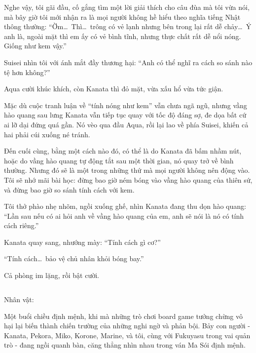 \documentclass[../main.tex]{subfiles}
\begin{document}
Nghe vậy, tôi gãi đầu, cố gắng tìm một lời giải thích cho câu đùa mà tôi vừa nói, mà bây giờ tôi mới nhận ra là mọi người không hề hiểu theo nghĩa tiếng Nhật thông thường: ``Ờm\dots\ Thì\dots\ trông có vẻ lạnh nhưng bên trong lại rất dễ chảy\dots\ Ý anh là, ngoài mặt thì em ấy có vẻ bình tĩnh, nhưng thực chất rất dễ nổi nóng. Giống như kem vậy.''

Suisei nhìn tôi với ánh mắt đầy thương hại: ``Anh có thể nghĩ ra cách so sánh nào tệ hơn không?''

Aqua cười khúc khích, còn Kanata thì đỏ mặt, vừa xấu hổ vừa tức giận.

Mặc dù cuộc tranh luận về ``tính nóng như kem'' vẫn chưa ngã ngũ, nhưng vầng hào quang sau lưng Kanata vẫn tiếp tục quay với tốc độ đáng sợ, đe dọa bất cứ ai lỡ dại đứng quá gần. Nó vèo qua đầu Aqua, rồi lại lao về phía Suisei, khiến cả hai phải cúi xuống né tránh.

Đến cuối cùng, bằng một cách nào đó, có thể là do Kanata đã bấm nhầm nút, hoặc do vầng hào quang tự động tắt sau một thời gian, nó quay trở về bình thường. Nhưng đó sẽ là một trong những thứ mà mọi người không nên động vào. Tôi sẽ nhớ mãi bài học: đừng bao giờ ném bóng vào vầng hào quang của thiên sứ, và đừng bao giờ so sánh tính cách với kem.

Tôi thở phào nhẹ nhõm, ngồi xuống ghế, nhìn Kanata đang thu dọn hào quang: ``Lần sau nếu có ai hỏi anh về vầng hào quang của em, anh sẽ nói là nó có tính cách riêng.''

Kanata quay sang, nhướng mày: ``Tính cách gì cơ?''

``Tính cách\dots\ bảo vệ chủ nhân khỏi bóng bay.''

Cả phòng im lặng, rồi bật cười.

\newpage

\subsection*{\label{ep-S7.IV}}
\vspace{-4pt}
\begin{center}
  {\caviar\fontsize{12pt}{12pt}\selectfont Nhân vật:      }
\end{center}

Một buổi chiều định mệnh, khi mà những trò chơi board game tưởng chừng vô hại lại biến thành chiến trường của những nghi ngờ và phản bội. Bảy con người - Kanata, Pekora, Miko, Korone, Marine, và tôi, cùng với Fukuyasu trong vai quản trò - đang ngồi quanh bàn, căng thẳng nhìn nhau trong ván Ma Sói định mệnh.
\end{document}
